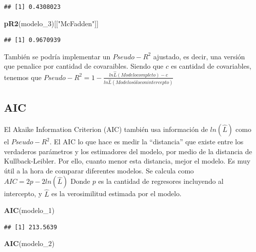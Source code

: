 \documentclass[]{book}
\newenvironment{Shaded}{\begin{snugshade}}{\end{snugshade}}
\newcommand{\KeywordTok}[1]{\textcolor[rgb]{0.13,0.29,0.53}{\textbf{#1}}}
\newcommand{\DecValTok}[1]{\textcolor[rgb]{0.00,0.00,0.81}{#1}}
\newcommand{\StringTok}[1]{\textcolor[rgb]{0.31,0.60,0.02}{#1}}
\newcommand{\NormalTok}[1]{#1}
\begin{document}
\begin{verbatim}
## [1] 0.4308023
\end{verbatim}

\begin{Shaded}
\begin{Highlighting}[]
\KeywordTok{pR2}\NormalTok{(modelo_}\DecValTok{3}\NormalTok{)[[}\StringTok{"McFadden"}\NormalTok{]]}
\end{Highlighting}
\end{Shaded}

\begin{verbatim}
## [1] 0.9670939
\end{verbatim}

También se podría implementar un \(Pseudo-R^2\) ajustado, es decir, una
versión que penalice por cantidad de covaraibles. Siendo que \(c\) es
cantidad de covariables, tenemos que
\(Pseudo-R^2= 1-\frac {ln \hat{L}(Modelo completo)-c}{ln \hat{L}(Modelo sólo con intercepto)}\)

\subsection{AIC}\label{aic}

El Akaike Information Criterion (AIC) también usa información de
\(ln(\hat {L})\) como el \(Pseudo-R^2\). El AIC lo que hace es medir la
``distancia'' que existe entre los verdaderos parámetros y los
estimadores del modelo, por medio de la distancia de Kullback-Leibler.
Por ello, cuanto menor esta distancia, mejor el modelo. Es muy útil a la
hora de comparar diferentes modelos. Se calcula como
\(AIC = 2p-2ln(\hat {L})\) Donde \(p\) es la cantidad de regresores
incluyendo al intercepto, y \(\hat{L}\) es la verosimilitud estimada por
el modelo.

\begin{Shaded}
\begin{Highlighting}[]
\KeywordTok{AIC}\NormalTok{(modelo_}\DecValTok{1}\NormalTok{)}
\end{Highlighting}
\end{Shaded}

\begin{verbatim}
## [1] 213.5639
\end{verbatim}

\begin{Shaded}
\begin{Highlighting}[]
\KeywordTok{AIC}\NormalTok{(modelo_}\DecValTok{2}\NormalTok{)}
\end{Highlighting}
\end{Shaded}
\end{document}

